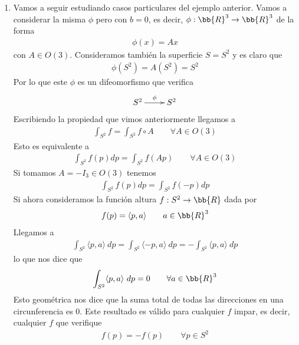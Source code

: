 \begin{ejemplo}
\begin{enumerate}
        \item Vamos a seguir estudiando casos particulares del ejemplo anterior. Vamos a considerar la misma $\phi$ pero con $b=0$, es decir, $\phi: \bb{R}^3 \to \bb{R}^3$ de la forma 
        \begin{gather*}
            \phi(x) = Ax
        \end{gather*}
        con $A\in O(3)$. Consideramos también la superficie $S=S^2$ y es claro que 
        \begin{gather*}
            \phi(S^2) = A(S^2) = S^2
        \end{gather*}
        Por lo que este $\phi$ es un difeomorfismo que verifica
        \begin{gather*}
            \xymatrix{
                S^2 \ar[r]^{\phi} & S^2
            }
        \end{gather*}
        Escribiendo la propiedad que vimos anteriormente llegamos a
        \begin{gather*}
            \int_{S^2} f = \int_{S^2} f \circ A \qquad \forall A \in O(3)
        \end{gather*}
        Esto es equivalente a 
        \begin{gather*}
            \int_{S^2} f(p) dp = \int_{S^2} f(Ap) \qquad \forall A \in O(3)
        \end{gather*}
        Si tomamos $A = - I_3\in O(3)$ tenemos
        \begin{gather*}
            \int_{S^2} f(p) dp = \int_{S^2} f(-p) dp
        \end{gather*}
        Si ahora consideramos la función altura $f: S^2 \to \bb{R}$ dada por 
        \begin{gather*}
            f(p) = \langle p,a \rangle  \qquad a\in \bb{R}^3
        \end{gather*}
        Llegamos a 
        \begin{gather*}
            \int_{S^2} \langle p,a \rangle\ dp = \int_{S^2} \langle -p, a \rangle\ dp = - \int_{S^2} \langle p,a \rangle\ dp
        \end{gather*}
        lo que nos dice que 
        \begin{gather*}
            \int_{S^2} \langle p,a \rangle\ dp = 0\qquad \forall a \in \bb{R}^3
        \end{gather*}
        Esto geométrica nos dice que la suma total de todas las direcciones en una circunferencia es 0. Este resultado es válido para cualquier $f$ impar, es decir, cualquier $f$ que verifique
        \begin{gather*}
            f(p) = -f(p) \qquad \forall p \in S^2
        \end{gather*}


\end{enumerate}
\end{ejemplo}
